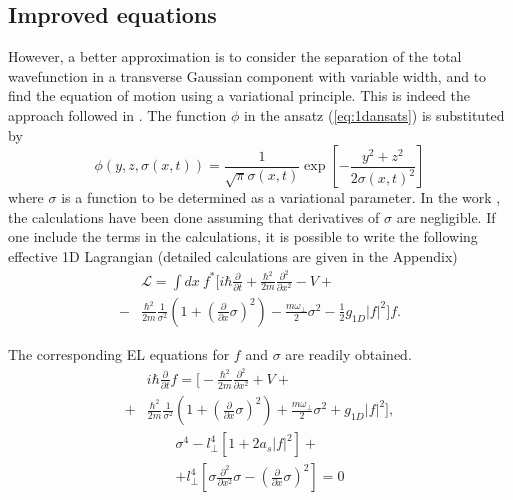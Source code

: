 \documentclass[pra,twocolumn]{revtex4-2}
\begin{document}
  \subsection{Improved equations}
  However, a better approximation is to consider the separation of the total wavefunction in a transverse Gaussian component with variable width, and to find the equation of motion using a variational principle. This is indeed the approach followed in \cite{salasnich_effective_2002}. The function $\phi$ in the ansatz (\ref{eq:1dansats}) is substituted by
  \begin{equation}
      \phi(y, z, \sigma(x, t)) = \dfrac{1}{\sqrt{\pi} \sigma(x, t)} \exp\left[-\frac{y^2+z^2}{2\sigma(x, t)^2}\right]
  \end{equation}
  where $\sigma$ is a function to be determined as a variational parameter.
  In the work \cite{salasnich_bose-einstein_2022}, the calculations have been done assuming that derivatives of $\sigma$ are negligible. If one include the terms in the calculations, it is possible to write the following effective 1D Lagrangian (detailed calculations are given in the Appendix)
  \begin{equation}\label{eq:1dlagrangian_full}
      \begin{split}
          &\mathcal{L}= \int dx  \ f^* \bigg[i \hbar \frac{\partial}{\partial t} + \frac{\hbar^2}{2 m} \frac{\partial^2}{\partial x^2} - V +\\- &\frac{\hbar^2}{2m} \frac{1}{\sigma^2}\left(1+ \left(\frac{\partial}{\partial x} \sigma\right)^2 \right) - \frac{m\omega_\perp}{2}\sigma^2 - \frac{1}{2}g_{1D}|f|^2 \bigg] f.
      \end{split}
  \end{equation}

  The corresponding EL equations for $f$ and $\sigma$ are readily obtained.
  \begin{equation}\label{eq:ELf}
  \begin{split}
      &i \hbar \frac{\partial}{\partial t} f = \bigg[- \frac{\hbar^2}{2 m} \frac{\partial^2}{\partial x^2} + V +\\+ &\frac{\hbar^2}{2m} \frac{1}{\sigma^2}\left(1+ \left(\frac{\partial}{\partial x} \sigma\right)^2 \right) + \frac{m\omega_\perp}{2}\sigma^2 + g_{1D}|f|^2 \bigg],
  \end{split}
  \end{equation}
  \begin{equation}\label{eq:ELsigma}
  \begin{split}
          \sigma^4 - l_\perp^4\left[1 + 2a_s|f|^2\right] +\\
          +l_\perp^4\left[\sigma \frac{\partial^2}{\partial x^2} \sigma -\left(\frac{\partial}{\partial x}\sigma\right)^2\right] = 0
  \end{split}
  \end{equation}
\end{document}
